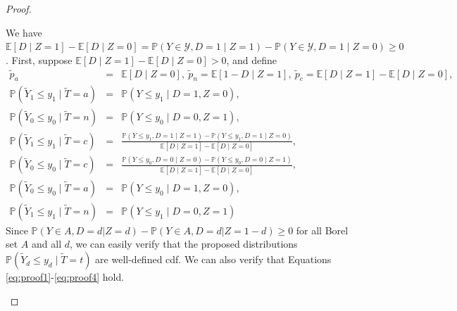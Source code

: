 \documentclass[12pt]{article}
\theoremstyle{plain}
\theoremstyle{definition}
\theoremstyle{remark}
\begin{document}
\begin{proof}
\begin{enumerate}
We have $\mathbb E[D\mid Z=1]-\mathbb E[D \mid Z=0]=\mathbb P(Y\in \mathcal Y, D=1\mid Z=1)-\mathbb P(Y\in \mathcal Y, D=1\mid Z=0) \geq 0$. First, suppose  $\mathbb E[D\mid Z=1]-\mathbb E[D \mid Z=0] > 0$, and define 
\begin{eqnarray*}
\tilde{p}_a &=& \mathbb E[D\mid Z=0], \ \tilde{p}_n=\mathbb E[1-D \mid Z=1], \ \tilde{p}_c=\mathbb E[D\mid Z=1]-\mathbb E[D \mid Z=0],\\
\mathbb P(\tilde{Y}_1 \leq y_1\mid \tilde{T}=a) &=& \mathbb P(Y \leq y_1 \mid D=1, Z=0),\\
\mathbb P(\tilde{Y}_0 \leq y_0\mid \tilde{T}=n) &=& \mathbb P(Y \leq y_0 \mid D=0, Z=1),\\
\mathbb P(\tilde{Y}_1 \leq y_1\mid \tilde{T}=c) &=& \frac{\mathbb P(Y \leq y_1,D=1 \mid Z=1)-\mathbb P(Y \leq y_1,D=1 \mid Z=0)}{\mathbb E[D\mid Z=1]-\mathbb E[D \mid Z=0]},\\
\mathbb P(\tilde{Y}_0 \leq y_0\mid \tilde{T}=c) &=& \frac{\mathbb P(Y \leq y_0,D=0 \mid Z=0)-\mathbb P(Y \leq y_0,D=0 \mid Z=1)}{\mathbb E[D\mid Z=1]-\mathbb E[D \mid Z=0]},\\
\mathbb P(\tilde{Y}_0 \leq y_0\mid \tilde{T}=a) &=& \mathbb P(Y \leq y_0 \mid D=1, Z=0),\\
\mathbb P(\tilde{Y}_1 \leq y_1\mid \tilde{T}=n) &=& \mathbb P(Y \leq y_1 \mid D=0, Z=1)
\end{eqnarray*}
Since $\mathbb{P}(Y \in A, D=d  \vert  Z=d)-\mathbb{P}(Y \in A, D=d  \vert  Z=1-d) \geq 0$ for all Borel set $A$ and all $d$, we can easily verify that the proposed distributions $\mathbb P(\tilde{Y}_d \leq y_d \mid \tilde{T}=t)$ are well-defined cdf. We can also verify that Equations \eqref{eq:proof1}-\eqref{eq:proof4} hold.   


\end{enumerate}
\end{proof}
\end{document}
